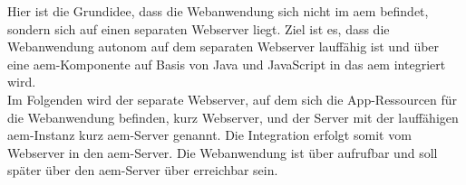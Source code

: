 \label{sec:ansatz-java}
Hier ist die Grundidee, dass die Webanwendung sich nicht im \ac{aem} befindet, sondern sich auf einen separaten Webserver liegt. Ziel ist es, dass die Webanwendung autonom auf dem separaten Webserver lauffähig ist und über eine \ac{aem}-Komponente auf Basis von Java und JavaScript in das \ac{aem} integriert wird.\\
Im Folgenden wird der separate Webserver, auf dem sich die App-Ressourcen für die Webanwendung befinden, kurz Webserver, und der Server mit der lauffähigen \ac{aem}-Instanz kurz \ac{aem}-Server genannt. Die Integration erfolgt somit vom Webserver in den \ac{aem}-Server. Die Webanwendung ist über \serverB aufrufbar und soll später über den \ac{aem}-Server über \serverA erreichbar sein.\\







